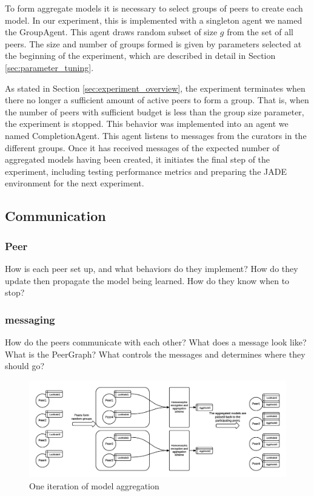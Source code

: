 To form aggregate models it is necessary to select groups of peers to create each model. In our experiment, this is implemented with a singleton agent we named the GroupAgent. This agent draws random subset of size $g$ from the set of all peers. The size and number of groups formed is given by parameters selected at the beginning of the experiment, which are described in detail in Section \ref{sec:parameter_tuning}. 

As stated in Section \ref{sec:experiment_overview},  the experiment terminates when there no longer a sufficient amount of active peers to form a group. That is, when the number of peers with sufficient budget is less than the group size parameter, the experiment is stopped. This behavior was implemented into an agent we named CompletionAgent. This agent listens to messages from the curators in the different groups. Once it has received messages of the expected number of aggregated models having been created, it initiates the final step of the experiment, including testing performance metrics and preparing the JADE environment for the next experiment. 



\subsection{Communication}
\subsubsection{Peer}
How is each peer set up, and what behaviors do they implement? 
How do they update then propagate the model being learned.
How do they know when to stop?
\subsubsection{messaging}
How do the peers communicate with each other?
What does a message look like?
What is the PeerGraph?
What controls the messages and determines where they should go?
\begin{figure}[h!]
	\centering
	\includegraphics[width=\textwidth]{fig/peerModelCreation}
	\caption{One iteration of model aggregation}
	\label{fig:peerAggregationFigure}
\end{figure}


